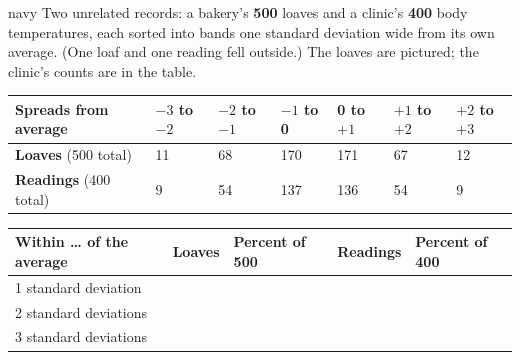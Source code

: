 \boxguard[12]
\begin{scenariobox}{navy}
\small
Two unrelated records: a bakery's \textbf{500} loaves and a clinic's \textbf{400} body
temperatures, each sorted into bands one standard deviation wide from its own average. (One loaf
and one reading fell outside.) The loaves are pictured; the clinic's counts are in the table.

\vspace{3pt}
\begin{center}
\end{center}
\vspace{2pt}

\renewcommand{\arraystretch}{1.05}
\begin{tabularx}{\linewidth}{@{} l Y Y Y Y Y Y @{}}
\textbf{Spreads from average} & $-3$ to $-2$ & $-2$ to $-1$ & $-1$ to 0 & 0 to $+1$ &
  $+1$ to $+2$ & $+2$ to $+3$ \\
\hline
\textbf{Loaves} (500 total) & 11 & 68 & 170 & 171 & 67 & 12 \\
\textbf{Readings} (400 total) & 9 & 54 & 137 & 136 & 54 & 9 \\
\end{tabularx}

\vspace{4pt}
\begin{tabularx}{\linewidth}{@{} l Y Y Y Y @{}}
\textbf{Within \ldots{} of the average} & \textbf{Loaves} & \textbf{Percent of 500} &
\textbf{Readings} & \textbf{Percent of 400} \\
 standard deviation &  &  &  &  \\
2 standard deviations &  &  &  &  \\
3 standard deviations &  &  &  &  \\
\end{tabularx}


\end{scenariobox}
